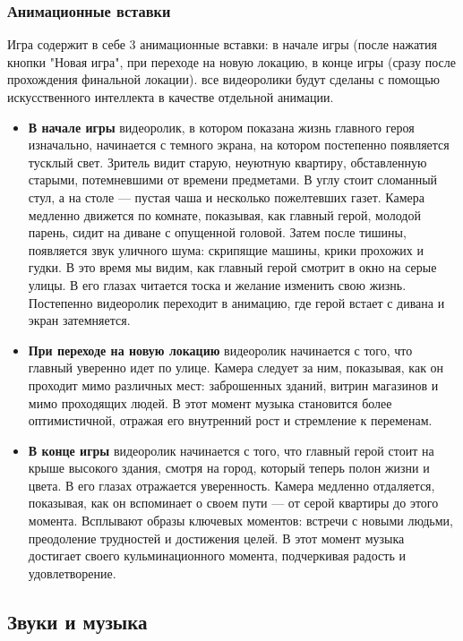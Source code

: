\documentclass[12pt]{article}
\begin{document}
        \subsubsection{Анимационные вставки}
        Игра содержит в себе 3 анимационные вставки: в начале игры (после нажатия кнопки "Новая игра", при переходе на новую локацию, в конце игры (сразу после прохождения финальной локации). все видеоролики будут сделаны с помощью искусственного интеллекта в качестве отдельной анимации.
        \begin{itemize}
            \item \textbf{В начале игры} видеоролик, в котором показана жизнь главного героя изначально, начинается с темного экрана, на котором постепенно появляется тусклый свет. Зритель видит старую, неуютную квартиру, обставленную старыми, потемневшими от времени предметами. В углу стоит сломанный стул, а на столе — пустая чаша и несколько пожелтевших газет. Камера медленно движется по комнате, показывая, как главный герой, молодой парень, сидит на диване с опущенной головой. Затем после тишины, появляется звук уличного шума: скрипящие машины, крики прохожих и гудки. В это время мы видим, как главный герой смотрит в окно на серые улицы. В его глазах читается тоска и желание изменить свою жизнь. Постепенно видеоролик переходит в анимацию, где герой встает с дивана и экран затемняется.
            \item \textbf{При переходе на новую локацию} видеоролик начинается с того, что главный уверенно идет по улице. Камера следует за ним, показывая, как он проходит мимо различных мест: заброшенных зданий, витрин магазинов и мимо проходящих людей. В этот момент музыка становится более оптимистичной, отражая его внутренний рост и стремление к переменам.
            \item \textbf{В конце игры} видеоролик начинается с того, что главный герой стоит на крыше высокого здания, смотря на город, который теперь полон жизни и цвета. В его глазах отражается уверенность. Камера медленно отдаляется, показывая, как он вспоминает о своем пути — от серой квартиры до этого момента. Всплывают образы ключевых моментов: встречи с новыми людьми, преодоление трудностей и достижения целей. В этот момент музыка достигает своего кульминационного момента, подчеркивая радость и удовлетворение. 
        \end{itemize}
    \subsection{Звуки и музыка}
\end{document}
